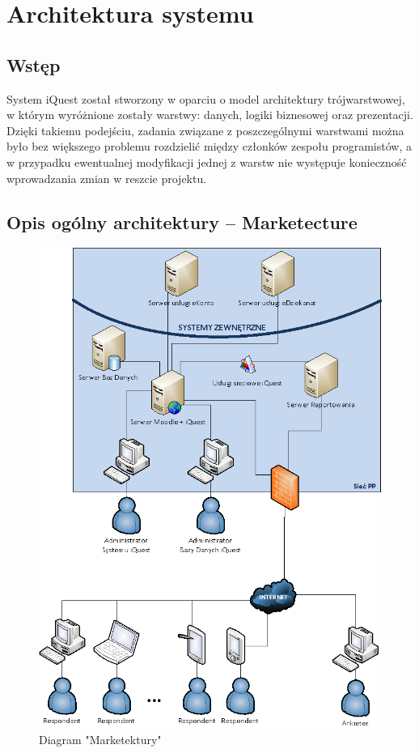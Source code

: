 \chapter{Architektura systemu}
\label{Chapter5}

\section{Wstęp}
\label{Chapter51}

System iQuest został stworzony w oparciu o model architektury trójwarstwowej, w którym wyróżnione zostały warstwy: danych, logiki biznesowej oraz prezentacji. Dzięki takiemu podejściu, zadania związane z poszczególnymi warstwami można było bez większego problemu rozdzielić między członków zespołu programistów, a w przypadku ewentualnej modyfikacji jednej z warstw nie występuje konieczność wprowadzania zmian w reszcie projektu.

\section{Opis ogólny architektury -- Marketecture}
\label{Chapter52}

\begin{figure}[H]
\centering\includegraphics[width=15cm]{figures/marketecture}
\caption{Diagram "Marketektury"}\label{rys:marketecture}
\end{figure}

